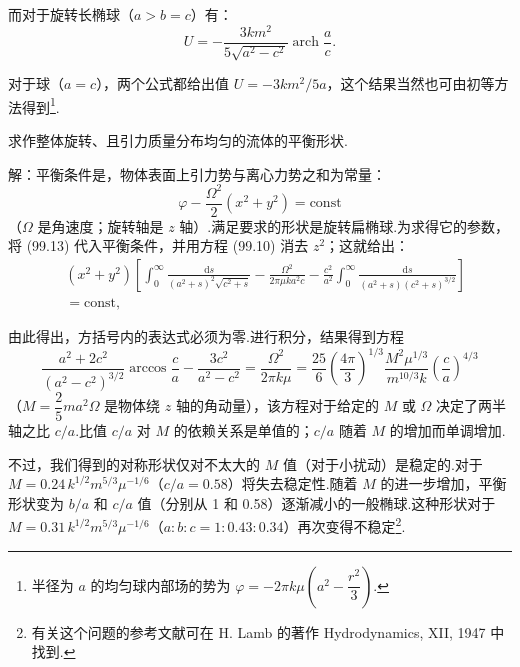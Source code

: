 而对于旋转长椭球（$a>b=c$）有：
\begin{equation}
  U=-\frac{3km^{2}}{5\sqrt{a^{2}-c^{2}}}
  \operatorname{arch}\frac{a}{c}.
\end{equation}

对于球（$a=c$），两个公式都给出值 $U=-3km^{2}/5a$，这个结果当然也可由初等方法得到\footnote{半径为 $a$ 的均匀球内部场的势为 $\varphi=-2\pi k\mu\left(a^{2}-\dfrac{r^{2}}{3}\right)$.}.

\begin{xiti}

\quad 求作整体旋转、且引力质量分布均匀的流体的平衡形状.

解：平衡条件是，物体表面上引力势与离心力势之和为常量：
\begin{equation*}
  \varphi-\frac{\Omega^{2}}{2}(x^{2}+y^{2})=\mathrm{const}
\end{equation*}
（$\Omega$ 是角速度；旋转轴是 $z$ 轴）.满足要求的形状是旋转扁椭球.为求得它的参数，将 (99.13) 代入平衡条件，并用方程 (99.10) 消去 $z^{2}$；这就给出：
\begin{equation*}
\begin{aligned}
  &(x^{2}+y^{2})\left[\int_{0}^{\infty}
  \frac{\mathrm{d}s}{(a^{2}+s)^{2}\sqrt{c^{2}+s}}
  -\frac{\Omega^{2}}{2\pi\mu ka^{2}c}
  -\frac{c^{2}}{a^{2}}\int_{0}^{\infty}
  \frac{\mathrm{d}s}{(a^{2}+s)(c^{2}+s)^{3/2}}\right]\\
  &={}\mathrm{const},
\end{aligned}
\end{equation*}

由此得出，方括号内的表达式必须为零.进行积分，结果得到方程
\begin{equation*}
  \frac{a^{2}+2c^{2}}{(a^{2}-c^{2})^{3/2}}\arccos\frac{c}{a}
  -\frac{3c^{2}}{a^{2}-c^{2}}
  =\frac{\Omega^{2}}{2\pi k\mu}
  =\frac{25}{6}\left(\frac{4\pi}{3}\right)^{1/3}
  \frac{M^{2}\mu^{1/3}}{m^{10/3}k}\left(\frac{c}{a}\right)^{4/3}
\end{equation*}
（$M=\dfrac{2}{5}ma^{2}\Omega$ 是物体绕 $z$ 轴的角动量），该方程对于给定的 $M$ 或 $\Omega$ 决定了两半轴之比 $c/a$.比值 $c/a$ 对 $M$ 的依赖关系是单值的；$c/a$ 随着 $M$ 的增加而单调增加.

不过，我们得到的对称形状仅对不太大的 $M$ 值（对于小扰动）是稳定的.对于 $M=0.24\allowbreak\,k^{1/2}m^{5/3}\mu^{-1/6}$（$c/a=0.58$）将失去稳定性.随着 $M$ 的进一步增加，平衡形状变为 $b/a$ 和 $c/a$ 值（分别从 1 和 0.58）逐渐减小的一般椭球.这种形状对于 $M=0.31\allowbreak\,k^{1/2}m^{5/3}\mu^{-1/6}$（$a:b:c=1:0.43:0.34$）再次变得不稳定\footnote{有关这个问题的参考文献可在 H. Lamb 的著作 Hydrodynamics, XII, 1947 中找到.}.

\end{xiti}

